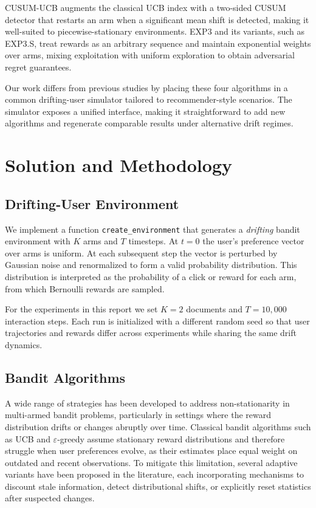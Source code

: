 \documentclass{scrartcl}
\begin{document}
CUSUM-UCB augments the classical UCB index with a two-sided CUSUM detector
that restarts an arm when a significant mean shift is detected, making it
well-suited to piecewise-stationary environments. EXP3 and its variants, such
as EXP3.S, treat rewards as an arbitrary sequence and maintain exponential
weights over arms, mixing exploitation with uniform exploration to obtain
adversarial regret guarantees.

Our work differs from previous studies by placing these four algorithms in a
common drifting-user simulator tailored to recommender-style scenarios. The
simulator exposes a unified interface, making it straightforward to add new
algorithms and regenerate comparable results under alternative drift regimes.

\section{Solution and Methodology}

\subsection{Drifting-User Environment}

We implement a function \texttt{create\_environment} that generates a
\emph{drifting} bandit environment with $K$ arms and $T$ timesteps. At $t=0$
the user’s preference vector over arms is uniform. At each subsequent step the
vector is perturbed by Gaussian noise and renormalized to form a valid
probability distribution. This distribution is interpreted as the probability
of a click or reward for each arm, from which Bernoulli rewards are sampled.

For the experiments in this report we set $K=2$ documents and $T=10{,}000$
interaction steps. Each run is initialized with a different random seed so
that user trajectories and rewards differ across experiments while sharing the
same drift dynamics.

\subsection{Bandit Algorithms}

A wide range of strategies has been developed to address non-stationarity in
multi-armed bandit problems, particularly in settings where the reward distribution
drifts or changes abruptly over time. Classical bandit algorithms such as UCB and
$\varepsilon$-greedy assume stationary reward distributions and therefore struggle when
user preferences evolve, as their estimates place equal weight on outdated and recent
observations. To mitigate this limitation, several adaptive variants have been proposed
in the literature, each incorporating mechanisms to discount stale information, detect
distributional shifts, or explicitly reset statistics after suspected changes.
\end{document}
